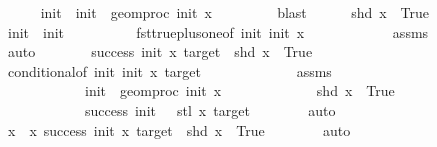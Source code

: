 \begin{isabellebody}
\ \ \ \ \isamarkupfalse%
\ init{\isacharprime}{\kern0pt}\ \ {\isachardoublequoteopen}init{\isacharprime}{\kern0pt}\ {\isacharequal}{\kern0pt}\ geom{\isacharunderscore}{\kern0pt}proc\ init\ x\ {}{\isachardoublequoteclose}\isanewline
\ \ \ \ \ \ \isamarkupfalse%
\ blast\isanewline
\ \ \ \ \isamarkupfalse%
\ {\isacartoucheopen}shd\ x\ {\isacharequal}{\kern0pt}\ True{\isacartoucheclose}\ \isamarkupfalse%
\ {\isachardoublequoteopen}init{\isacharprime}{\kern0pt}\ {\isacharequal}{\kern0pt}\ init\ {\isacharplus}{\kern0pt}\ {}{\isachardoublequoteclose}\isanewline
\ \ \ \ \ \ \isamarkupfalse%
\ fst{\isacharunderscore}{\kern0pt}true{\isacharunderscore}{\kern0pt}plus{\isacharunderscore}{\kern0pt}one{\isacharbrackleft}{\kern0pt}of\ init{\isacharprime}{\kern0pt}\ init\ x{\isacharbrackright}{\kern0pt}\isanewline
\ \ \ \ \ \ \ \ \ \ \ \ assms{\isacharparenleft}{\kern0pt}{}{\isacharparenright}{\kern0pt}\isanewline
\ \ \ \ \ \ \isamarkupfalse%
\ auto\isanewline
\ \ \ \ \isamarkupfalse%
\ \isamarkupfalse%
\ {\isachardoublequoteopen}success\ init\ x\ target\ {\isasymand}\ shd\ x\ {\isacharequal}{\kern0pt}\ True{\isachardoublequoteclose}\isanewline
\ \ \ \ \ \ \isamarkupfalse%
\ conditional{}{\isacharbrackleft}{\kern0pt}of\ init{\isacharprime}{\kern0pt}\ init\ x\ target{\isacharbrackright}{\kern0pt}\ \isanewline
\ \ \ \ \ \ \ \ \ \ \ \ assms\isanewline
\ \ \ \ \ \ \ \ \ \ \ \ {\isacartoucheopen}init{\isacharprime}{\kern0pt}\ {\isacharequal}{\kern0pt}\ geom{\isacharunderscore}{\kern0pt}proc\ init\ x\ {}{\isacartoucheclose}\isanewline
\ \ \ \ \ \ \ \ \ \ \ \ {\isacartoucheopen}shd\ x\ {\isacharequal}{\kern0pt}\ True{\isacartoucheclose}\isanewline
\ \ \ \ \ \ \ \ \ \ \ \ {\isacartoucheopen}success\ {\isacharparenleft}{\kern0pt}init\ {\isacharplus}{\kern0pt}\ {}{\isacharparenright}{\kern0pt}\ {\isacharparenleft}{\kern0pt}stl\ x{\isacharparenright}{\kern0pt}\ target{\isacartoucheclose}\isanewline
\ \ \ \ \ \ \isamarkupfalse%
\ auto\isanewline
\ \ \ \ \isamarkupfalse%
\ \isamarkupfalse%
\ {\isachardoublequoteopen}x\ {\isasymin}\ {\isacharbraceleft}{\kern0pt}x{\isachardot}{\kern0pt}\ success\ init\ x\ target\ {\isasymand}\ shd\ x\ {\isacharequal}{\kern0pt}\ True{\isacharbraceright}{\kern0pt}{\isachardoublequoteclose}\isanewline
\ \ \ \ \ \ \isamarkupfalse%
\ auto\isanewline
\ \ \isamarkupfalse%

\end{isabellebody}
